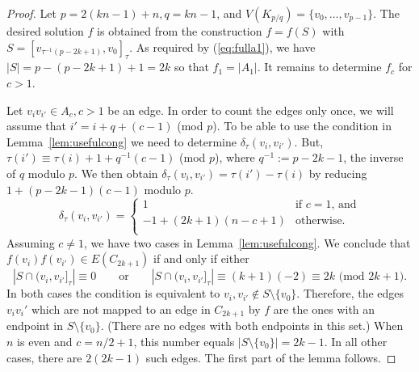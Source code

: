 \documentclass[11pt,a4paper]{article}
\begin{document}
\begin{proof}
Let $p = 2(kn-1)+n, q = kn-1$, and $V(K_{p/q}) = \{v_0,\ldots,v_{p-1}\}$.
The desired solution $f$ is obtained from the construction $f = f(S)$
with $S = [v_{\tau^{-1}(p-2k+1)},v_0]_{\tau}$.
As required by (\ref{eq:fulla1}), we have $|S| = p-(p-2k+1)+1 = 2k$ so that
$f_1 = |A_1|$.
It remains to determine $f_c$ for $c > 1$.

Let $v_i v_{i'} \in A_c, c > 1$ be an edge.
In order to count the edges only once, we will assume that $i' = i+q+(c-1) $ (mod $p$). To be able to use the condition in Lemma~\ref{lem:usefulcong} we need to
determine $\delta_{\tau}(v_i, v_{i'})$.
But, $\tau(i') \equiv \tau(i)+1+q^{-1}(c-1) $ (mod $p$), where
$q^{-1} := p-2k-1$, the inverse of $q$ modulo $p$.
We then obtain $\delta_{\tau}(v_i, v_{i'}) = \tau(i')-\tau(i)$ by reducing $1+(p-2k-1)(c-1)$ modulo $p$.
\[
\delta_{\tau}(v_i, v_{i'}) = \begin{cases}
  1 & \text{if $c = 1$, and} \\
  -1+(2k+1)(n-c+1) & \text{otherwise.} \\
\end{cases}
\]
Assuming $c \neq 1$, we have two cases in Lemma~\ref{lem:usefulcong}.
We conclude that 
$f(v_i) f(v_{i'}) \in E(C_{2k+1})$ if and only if
either 
\begin{equation}
\label{eq:recycle}
|S \cap (v_{i},v_{i'}]_{\tau}| \equiv 0 \qquad \text{or} \qquad
|S \cap (v_{i},v_{i'}]_{\tau}| \equiv (k+1)(-2) \equiv 2k \text{ (mod $2k+1$)}.
\end{equation}
In both cases the condition is equivalent to $v_i, v_{i'} \not\in S \setminus \{v_0\}$.
Therefore, the edges $v_i v_i'$ which are not mapped to an edge in $C_{2k+1}$ by $f$ are the ones with an endpoint in $S \setminus \{v_0\}$. (There are no edges with both endpoints in this set.) 
When $n$ is even and $c = n/2+1$, this number equals $|S \setminus \{v_0\}| = 2k-1$.
In all other cases, there are $2(2k-1)$ such edges.
The first part of the lemma follows.


\end{proof}
\end{document}
